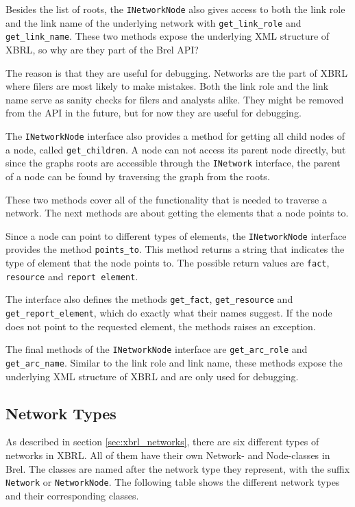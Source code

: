 Besides the list of roots, the \texttt{INetworkNode} also gives access to both the link role and the link name 
of the underlying network with \texttt{get\_link\_role} and \texttt{get\_link\_name}.
These two methods expose the underlying XML structure of XBRL, so why are they part of the Brel API?

The reason is that they are useful for debugging.
Networks are the part of XBRL where filers are most likely to make mistakes.
Both the link role and the link name serve as sanity checks for filers and analysts alike.
They might be removed from the API in the future, but for now they are useful for debugging.

The \texttt{INetworkNode} interface also provides a method for getting all child nodes of a node, called \texttt{get\_children}.
A node can not access its parent node directly, but since the graphs roots are accessible through the \texttt{INetwork} interface,
the parent of a node can be found by traversing the graph from the roots.

These two methods cover all of the functionality that is needed to traverse a network.
The next methods are about getting the elements that a node points to.

Since a node can point to different types of elements, the \texttt{INetworkNode} interface provides the method \texttt{points\_to}.
This method returns a string that indicates the type of element that the node points to.
The possible return values are \texttt{fact}, \texttt{resource} and \texttt{report element}.

The interface also defines the methods \texttt{get\_fact}, \texttt{get\_resource} and \texttt{get\_report\_element}, 
which do exactly what their names suggest.
If the node does not point to the requested element, the methods raises an exception.

The final methods of the \texttt{INetworkNode} interface are \texttt{get\_arc\_role} and \texttt{get\_arc\_name}.
Similar to the link role and link name, these methods expose the underlying XML structure of XBRL and are only used for debugging.

\subsection{Network Types}

As described in section \ref{sec:xbrl_networks}, there are six different types of networks in XBRL.
All of them have their own Network- and Node-classes in Brel.
The classes are named after the network type they represent, with the suffix \texttt{Network} or \texttt{NetworkNode}.
The following table shows the different network types and their corresponding classes.

